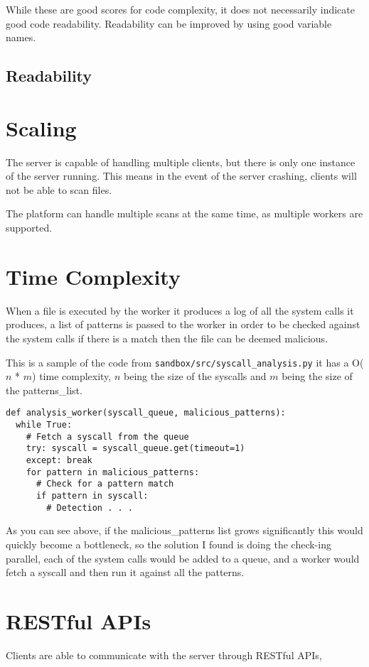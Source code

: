 While these are good scores for code complexity,
it does not necessarily indicate good code readability.
Readability can be improved by using good variable names.

\subsection{Readability}

\section{Scaling}
The server is capable of handling multiple clients,
but there is only one instance of the server running.
This means in the event of the server crashing, clients will not be able to scan files.

The platform can handle multiple scans at the same time, as multiple workers are supported.

\section{Time Complexity}
When a file is executed by the worker it produces a log of all the
system calls it produces, a list of patterns is passed to
the worker in order to be checked against the system calls
if there is a match then the file can be deemed malicious.

This is a sample of the code from \texttt{sandbox/src/syscall\_analysis.py}
it has a O($n$ * $m$) time complexity, $n$ being the size of the syscalls
and $m$ being the size of the patterns\_list.
\begin{lstlisting}
def analysis_worker(syscall_queue, malicious_patterns):
  while True:
    # Fetch a syscall from the queue
    try: syscall = syscall_queue.get(timeout=1)
    except: break
    for pattern in malicious_patterns:
      # Check for a pattern match
      if pattern in syscall:
        # Detection . . .
\end{lstlisting}

As you can see above, if the malicious\_patterns list grows
significantly this would quickly become a bottleneck,
so the solution I found is doing the check-ing parallel,
each of the system calls would be added to a queue,
and a worker would fetch a syscall and then run it against all the patterns.

\section{RESTful APIs}
Clients are able to communicate with the server through RESTful APIs,


